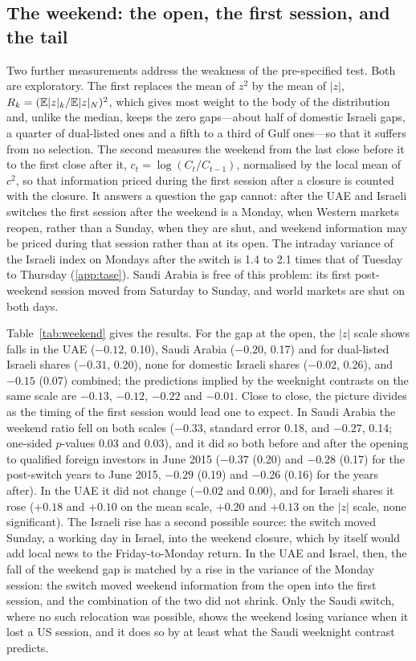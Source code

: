 \subsection{The weekend: the open, the first session, and the tail}\label{sec:robust}
Two further measurements address the weakness of the pre-specified test. Both are exploratory. The first replaces the mean of $z^2$ by the mean of $|z|$, $R_k=(\mathbb{E}|z|_k/\mathbb{E}|z|_N)^2$, which gives most weight to the body of the distribution and, unlike the median, keeps the zero gaps---about half of domestic Israeli gaps, a quarter of dual-listed ones and a fifth to a third of Gulf ones---so that it suffers from no selection. The second measures the weekend from the last close before it to the first close after it, $c_t=\log(C_t/C_{t-1})$, normalised by the local mean of $c^2$, so that information priced during the first session after a closure is counted with the closure. It answers a question the gap cannot: after the UAE and Israeli switches the first session after the weekend is a Monday, when Western markets reopen, rather than a Sunday, when they are shut, and weekend information may be priced during that session rather than at its open. The intraday variance of the Israeli index on Mondays after the switch is 1.4 to 2.1 times that of Tuesday to Thursday (\ref{app:tase}). Saudi Arabia is free of this problem: its first post-weekend session moved from Saturday to Sunday, and world markets are shut on both days.

Table~\ref{tab:weekend} gives the results. For the gap at the open, the $|z|$ scale shows falls in the UAE ($-0.12$, 0.10), Saudi Arabia ($-0.20$, 0.17) and for dual-listed Israeli shares ($-0.31$, 0.20), none for domestic Israeli shares ($-0.02$, 0.26), and $-0.15$ (0.07) combined; the predictions implied by the weeknight contrasts on the same scale are $-0.13$, $-0.12$, $-0.22$ and $-0.01$. Close to close, the picture divides as the timing of the first session would lead one to expect. In Saudi Arabia the weekend ratio fell on both scales ($-0.33$, standard error 0.18, and $-0.27$, 0.14; one-sided $p$-values 0.03 and 0.03), and it did so both before and after the opening to qualified foreign investors in June 2015 ($-0.37$ (0.20) and $-0.28$ (0.17) for the post-switch years to June 2015, $-0.29$ (0.19) and $-0.26$ (0.16) for the years after). In the UAE it did not change ($-0.02$ and $0.00$), and for Israeli shares it rose ($+0.18$ and $+0.10$ on the mean scale, $+0.20$ and $+0.13$ on the $|z|$ scale, none significant). The Israeli rise has a second possible source: the switch moved Sunday, a working day in Israel, into the weekend closure, which by itself would add local news to the Friday-to-Monday return. In the UAE and Israel, then, the fall of the weekend gap is matched by a rise in the variance of the Monday session: the switch moved weekend information from the open into the first session, and the combination of the two did not shrink. Only the Saudi switch, where no such relocation was possible, shows the weekend losing variance when it lost a US session, and it does so by at least what the Saudi weeknight contrast predicts.


